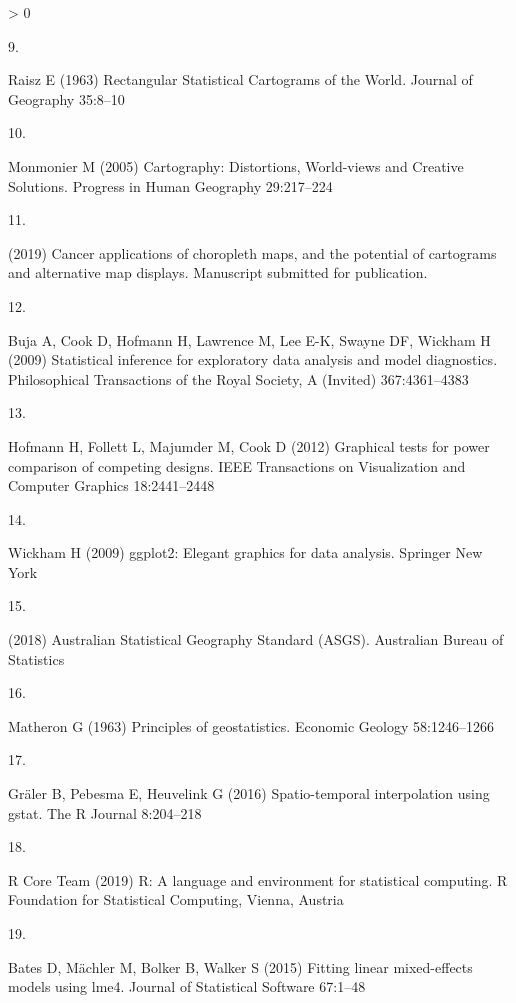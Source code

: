 \documentclass[conference,final,]{IEEEtran}
\newlength{\csllabelwidth}
\newlength{\cslhangindent}
\newenvironment{CSLReferences}[3] %
 {%
  \setlength{\parindent}{0pt}
  \ifodd #1 \everypar{\setlength{\hangindent}{\cslhangindent}}\ignorespaces\fi
  \ifnum #2 > 0
  \setlength{\parskip}{#3\baselineskip}
  \fi
 }%
 {}
\newcommand{\CSLLeftMargin}[1]{\parbox[t]{\maxof{\widthof{#1}}{\csllabelwidth}}{#1}}
\newcommand{\CSLRightInline}[1]{\parbox[t]{\linewidth}{#1}}
\begin{document}
\begin{CSLReferences}{0}{0}
\leavevmode\hypertarget{ref-RSCW}{}%
\CSLLeftMargin{9. }
\CSLRightInline{Raisz E (1963) {Rectangular Statistical Cartograms of the World}. Journal of Geography 35:8--10}

\leavevmode\hypertarget{ref-CDWCS}{}%
\CSLLeftMargin{10. }
\CSLRightInline{Monmonier M (2005) {Cartography: Distortions, World-views and Creative Solutions}. Progress in Human Geography 29:217--224}

\leavevmode\hypertarget{ref-review}{}%
\CSLLeftMargin{11. }
\CSLRightInline{(2019) Cancer applications of choropleth maps, and the potential of cartograms and alternative map displays. Manuscript submitted for publication. }

\leavevmode\hypertarget{ref-BCHLLSW09}{}%
\CSLLeftMargin{12. }
\CSLRightInline{Buja A, Cook D, Hofmann H, Lawrence M, Lee E-K, Swayne DF, Wickham H (2009) Statistical inference for exploratory data analysis and model diagnostics. Philosophical Transactions of the Royal Society, A (Invited) 367:4361--4383}

\leavevmode\hypertarget{ref-GTPCCD}{}%
\CSLLeftMargin{13. }
\CSLRightInline{Hofmann H, Follett L, Majumder M, Cook D (2012) Graphical tests for power comparison of competing designs. IEEE Transactions on Visualization and Computer Graphics 18:2441--2448}

\leavevmode\hypertarget{ref-ggplot2}{}%
\CSLLeftMargin{14. }
\CSLRightInline{Wickham H (2009) ggplot2: Elegant graphics for data analysis. Springer New York}

\leavevmode\hypertarget{ref-abs2016}{}%
\CSLLeftMargin{15. }
\CSLRightInline{(2018) {Australian Statistical Geography Standard (ASGS)}. Australian Bureau of Statistics }

\leavevmode\hypertarget{ref-POG}{}%
\CSLLeftMargin{16. }
\CSLRightInline{Matheron G (1963) Principles of geostatistics. Economic Geology 58:1246--1266}

\leavevmode\hypertarget{ref-gstat}{}%
\CSLLeftMargin{17. }
\CSLRightInline{Gräler B, Pebesma E, Heuvelink G (2016) Spatio-temporal interpolation using gstat. The R Journal 8:204--218}

\leavevmode\hypertarget{ref-RCore}{}%
\CSLLeftMargin{18. }
\CSLRightInline{R Core Team (2019) R: A language and environment for statistical computing. R Foundation for Statistical Computing, Vienna, Austria}

\leavevmode\hypertarget{ref-lme4}{}%
\CSLLeftMargin{19. }
\CSLRightInline{Bates D, Mächler M, Bolker B, Walker S (2015) Fitting linear mixed-effects models using {lme4}. Journal of Statistical Software 67:1--48}


\end{CSLReferences}
\end{document}
